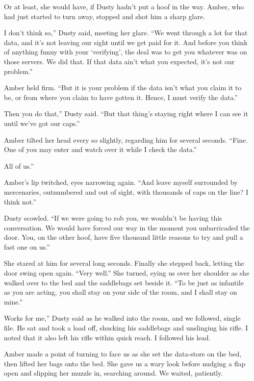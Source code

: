 Or at least, she would have, if Dusty hadn’t put a hoof in the way. Amber, who had just started to turn away, stopped and shot him a sharp glare.

\leavevmode{}I don’t think so,” Dusty said, meeting her glare. “We went through a lot for that data, and it’s not leaving our sight until we get paid for it. And before you think of anything funny with your ‘verifying’, the deal was to get you whatever was on those servers. We did that. If that data ain’t what you expected, it’s not our problem.”

Amber held firm. “But it is your problem if the data isn’t what you claim it to be, or from where you claim to have gotten it. Hence, I must verify the data.”

\leavevmode{}Then you do that,” Dusty said. “But that thing’s staying right where I can see it until we’ve got our caps.”

Amber tilted her head every so slightly, regarding him for several seconds. “Fine. One of you may enter and watch over it while I check the data.”

\leavevmode{}All of us.”

Amber’s lip twitched, eyes narrowing again. “And leave myself surrounded by mercenaries, outnumbered and out of sight, with thousands of caps on the line? I think not.”

Dusty scowled. “If we were going to rob you, we wouldn’t be having this conversation. We would have forced our way in the moment you unbarricaded the door. You, on the other hoof, have five thousand little reasons to try and pull a fast one on us.”

She stared at him for several long seconds. Finally she stepped back, letting the door swing open again. “Very well.” She turned, eying us over her shoulder as she walked over to the bed and the saddlebags set beside it. “To be just as infantile as you are acting, you shall stay on your side of the room, and I shall stay on mine.”

\leavevmode{}Works for me,” Dusty said as he walked into the room, and we followed, single file. He sat and took a load off, shucking his saddlebags and unslinging his rifle. I noted that it also left his rifle within quick reach. I followed his lead.

Amber made a point of turning to face us as she set the data-store on the bed, then lifted her bags onto the bed. She gave us a wary look before nudging a flap open and slipping her muzzle in, searching around. We waited, patiently.

